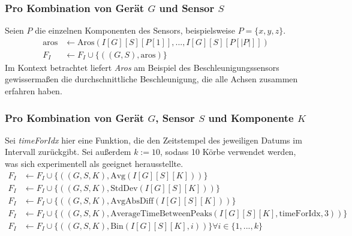 \subsubsection{Pro Kombination von Gerät $G$ und Sensor $S$}
Seien $P$ die einzelnen Komponenten des Sensors, beispielsweise $P = \{x, y, z\}$.
\begin{align*}
    \text{aros} &\gets \text{Aros}(I[G][S][P[1]], ..., I[G][S][P[|P|]]) \\
    F_I &\gets F_I \cup \{((G, S), \text{aros})\}
\end{align*}
Im Kontext betrachtet liefert \textit{Aros} am Beispiel des Beschleunigungssensors gewissermaßen die durchschnittliche Beschleunigung, die alle Achsen zusammen erfahren haben.
\subsubsection{Pro Kombination von Gerät $G$, Sensor $S$ und Komponente $K$}
Sei \textit{timeForIdx} hier eine Funktion, die den Zeitstempel des jeweiligen Datums im Intervall zurückgibt. Sei außerdem $k := 10$, sodass 10 Körbe verwendet werden, was sich experimentell als geeignet herausstellte.
\begin{align*}
    F_I &\gets F_I \cup \{((G, S, K), \text{Avg}(I[G][S][K]))\} \\
    F_I &\gets F_I \cup \{((G, S, K), \text{StdDev}(I[G][S][K]))\} \\
    F_I &\gets F_I \cup \{((G, S, K), \text{AvgAbsDiff}(I[G][S][K]))\} \\
    F_I &\gets F_I \cup \{((G, S, K), \text{AverageTimeBetweenPeaks}(I[G][S][K], \text{timeForIdx}, 3))\} \\
    F_I &\gets F_I \cup \{((G, S, K), \text{Bin}(I[G][S][K], i))\} \forall i \in \{1, ..., k\}
\end{align*}

